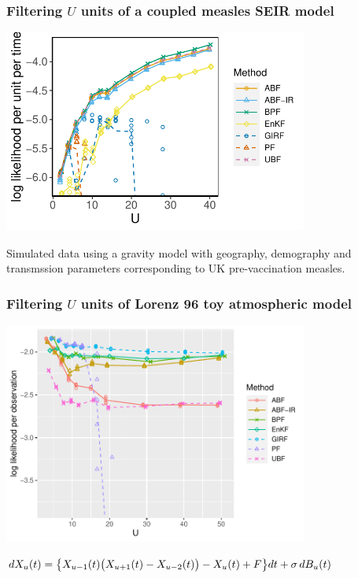 \documentclass{beamer}
\begin{document}
\begin{frame}
\frametitle{Filtering $U$ units of a coupled measles SEIR model}

\vspace{-3mm}

\begin{center}
\includegraphics[width=10cm]{mscale_loglik_plot-1.pdf}


\end{center}

\vspace{-2mm}

Simulated data using a gravity model with geography, demography and transmssion parameters corresponding to UK pre-vaccination measles.


\end{frame}


\begin{frame}
\frametitle{Filtering $U$ units of Lorenz 96 toy atmospheric model} 

\vspace{-3mm}

\begin{center}
\includegraphics[width=10cm]{lz_loglik_plot-1.pdf}

\vspace{-1mm}

$dX_{u}(t) = \big \{  X_{u-1}(t) \big(X_{u+1}(t) - X_{u-2}(t)\big) - X_{u}(t) + F \big\} dt + \sigma \, dB_{u}(t)$

\end{center}

\end{frame}
\end{document}
